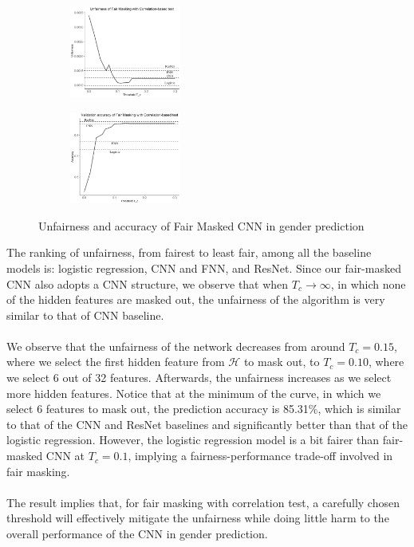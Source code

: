\begin{figure}[H]
	\centering
	\begin{subfigure}
		\centering
		\includegraphics[width=0.4\textwidth]{figure/fairmasking-c-f.png}
	\end{subfigure}
	\quad
	\begin{subfigure}
		\centering
		\includegraphics[width=0.4\textwidth]{figure/fairmasking-c-a.png}
	\end{subfigure}
	\caption{Unfairness and accuracy of Fair Masked CNN in gender prediction}
	\label{fig: fairmasking}
\end{figure}

The ranking of unfairness, from fairest to least fair, among all the baseline models is: logistic regression, CNN and FNN, and ResNet. Since our fair-masked CNN also adopts a CNN structure, we observe that when $T_c \rightarrow \infty$, in which none of the hidden features are masked out, the unfairness of the algorithm is very similar to that of CNN baseline.
\\ \\
We observe that the unfairness of the network decreases from around $T_c = 0.15$, where we select the first hidden feature from $\mathcal{H}$ to mask out, to  $T_c = 0.10$, where we select 6 out of 32 features. Afterwards, the unfairness increases as we select more hidden features. Notice that at the minimum of the curve, in which we select 6 features to mask out, the prediction accuracy is 85.31$\%$, which is similar to that of the CNN and ResNet baselines and significantly better than that of the logistic regression. However, the logistic regression model is a bit fairer than fair-masked CNN at $T_c = 0.1$, implying a fairness-performance trade-off involved in fair masking.
\\ \\ 
The result implies that, for fair masking with correlation test, a carefully chosen threshold will effectively mitigate the unfairness while doing little harm to the overall performance of the CNN in gender prediction.

